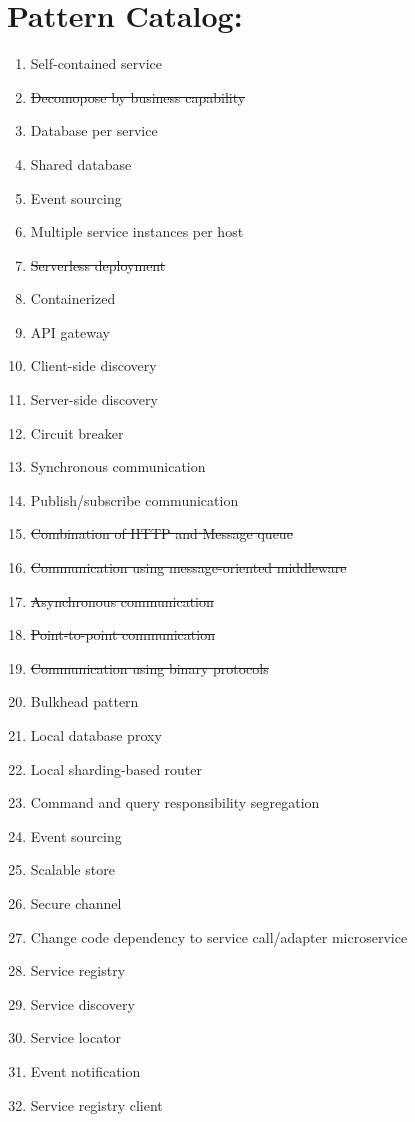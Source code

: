 \documentclass{article}
\theoremstyle{mytheoremstyle}
\theoremstyle{mytheoremstyle}
\theoremstyle{myproblemstyle}
\begin{document}
\section{Pattern Catalog:}
\begin{enumerate}
  \item Self-contained service 
  \item \sout{Decomopose by business capability} 
  \item Database per service 
  \item Shared database 
  \item Event sourcing 
  \item Multiple service instances per host
  \item \sout{Serverless deployment} 
  \item Containerized 
  \item API gateway
  \item Client-side discovery
  \item Server-side discovery 
  \item Circuit breaker
  \item Synchronous communication
  \item Publish/subscribe communication
  \item \sout{Combination of HTTP and Message queue}
  \item \sout{Communication using message-oriented middleware}
  \item \sout{Asynchronous communication}
  \item \sout{Point-to-point communication}
  \item \sout{Communication using binary protocols}
  \item Bulkhead pattern
  \item Local database proxy
  \item Local sharding-based router
  \item Command and query responsibility segregation
  \item Event sourcing 
  \item Scalable store
  \item Secure channel
  \item Change code dependency to service call/adapter microservice 
  \item Service registry 
  \item Service discovery 
  \item Service locator 
  \item Event notification 
  \item Service registry client 

\end{enumerate}
\end{document}
